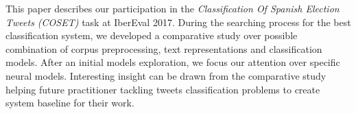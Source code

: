 \abstract

This paper describes our participation in the \emph{Classification Of Spanish Election Tweets (COSET)} task at IberEval 2017.
During the searching process for the best classification system, we developed a comparative study over possible combination of corpus preprocessing, text representations and classification models. After an initial models exploration, we focus our attention over specific neural models.
Interesting insight can be drawn from the comparative study helping future practitioner tackling tweets classification problems to create system baseline for their work.